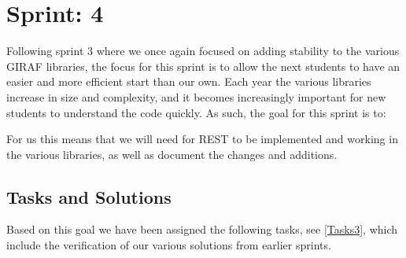 \chapter{Sprint: 4}

Following sprint 3 where we once again focused on adding stability to the
various GIRAF libraries, the focus for this sprint is to allow the next students
to have an easier and more efficient start than our own. Each year the various
libraries increase in size and complexity, and it becomes increasingly
important for new students to understand the code quickly. As such, the goal
for this sprint is to:

\nl

For us this means that we will need for REST to be implemented and working
in the various libraries, as well as document the changes and additions.


\section{Tasks and Solutions}

Based on this goal we have been assigned the following tasks, see
\autoref{Tasks3}, which include the verification of our various solutions from
earlier sprints.

